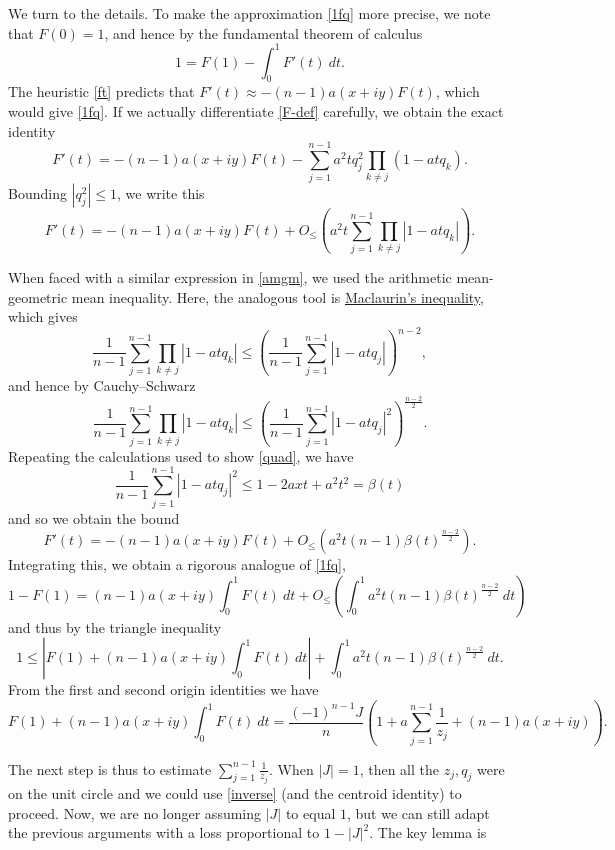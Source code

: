 \documentclass[12pt]{article}
\begin{document}
We turn to the details.  To make the approximation \eqref{1fq} more precise, we note that $F(0)=1$, and hence by the fundamental theorem of calculus
$$ 1 = F(1) - \int_0^1 F'(t)\ dt.$$
The heuristic \eqref{ft} predicts that $F'(t) \approx -(n-1) a(x+iy) F(t)$, which would give \eqref{1fq}.  If we actually differentiate \eqref{F-def} carefully, we obtain the exact identity
$$ F'(t) = - (n-1) a(x+iy) F(t) - \sum_{j=1}^{n-1} a^2 t q^2_j \prod_{k \neq j} (1 - atq_k).$$
Bounding $|q^2_j| \leq 1$, we write this 
$$ F'(t) = - (n-1) a(x+iy) F(t) + O_{\leq} ( a^2 t \sum_{j=1}^{n-1} \prod_{k \neq j} |1 - atq_k| ).$$

When faced with a similar expression in \eqref{amgm}, we used the arithmetic mean-geometric mean inequality.  Here, the analogous tool is \href{https://en.wikipedia.org/wiki/Maclaurin\%27s_inequality}{Maclaurin's inequality}, which gives
$$
\frac{1}{n-1} \sum_{j=1}^{n-1} \prod_{k \neq j} |1 - atq_k| \leq (\frac{1}{n-1} \sum_{j=1}^{n-1} |1 - at q_j|)^{n-2},$$
and hence by Cauchy--Schwarz
$$
\frac{1}{n-1} \sum_{j=1}^{n-1} \prod_{k \neq j} |1 - atq_k| \leq (\frac{1}{n-1} \sum_{j=1}^{n-1} |1 - at q_j|^2)^{\frac{n-2}{2}}.$$
Repeating the calculations used to show \eqref{quad}, we have
$$ \frac{1}{n-1} \sum_{j=1}^{n-1} |1 - at q_j|^2 \leq 1 - 2 a x t + a^2 t^2 = \beta(t)$$
and so we obtain the bound
$$ F'(t) = - (n-1) a(x+iy) F(t) + O_{\leq} ( a^2 t (n-1) \beta(t)^{\frac{n-2}{2}} ).$$
Integrating this, we obtain a rigorous analogue of \eqref{1fq},
$$ 1 - F(1) = (n-1) a(x+iy) \int_0^1 F(t)\ dt + O_{\leq} ( \int_0^1 a^2 t (n-1) \beta(t)^{\frac{n-2}{2}}\ dt )$$
and thus by the triangle inequality
\begin{equation}\label{tri}
 1 \leq |F(1) + (n-1) a(x+iy) \int_0^1 F(t)\ dt| + \int_0^1 a^2 t (n-1) \beta(t)^{\frac{n-2}{2}}\ dt.
\end{equation}
From the first and second origin identities we have
\begin{equation}\label{f1aq}
 F(1) + (n-1) a(x+iy) \int_0^1 F(t)\ dt = \frac{(-1)^{n-1} J}{n} 
 \left(1 + a \sum_{j=1}^{n-1} \frac{1}{z_j} + (n-1) a(x+iy) \right).
\end{equation}

The next step is thus to estimate $\sum_{j=1}^{n-1} \frac{1}{z_j}$.  When $|J|=1$, then all the $z_j, q_j$ were on the unit circle and we could use \eqref{inverse} (and the centroid identity) to proceed.  Now, we are no longer assuming $|J|$ to equal $1$, but we can still adapt the previous arguments with a loss proportional to $1 - |J|^2$.  The key lemma is
\end{document}
